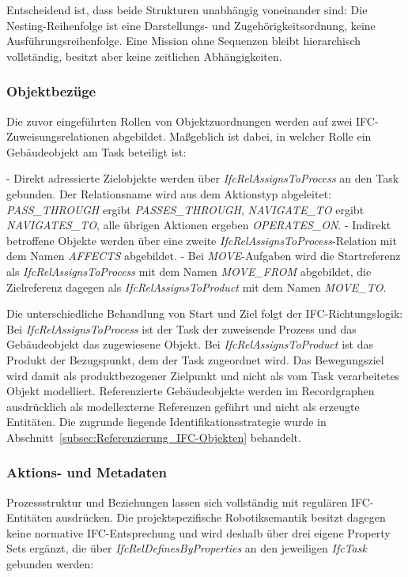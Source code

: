 Entscheidend ist, dass beide Strukturen unabhängig voneinander sind: Die Nesting-Reihenfolge ist
eine Darstellungs- und Zugehörigkeitsordnung, keine Ausführungsreihenfolge. Eine Mission ohne
Sequenzen bleibt hierarchisch vollständig, besitzt aber keine zeitlichen Abhängigkeiten.

\subsubsection{Objektbezüge}

Die zuvor eingeführten Rollen von Objektzuordnungen werden auf zwei IFC-Zuweisungsrelationen
abgebildet. Maßgeblich ist dabei, in welcher Rolle ein Gebäudeobjekt am Task beteiligt ist:

- Direkt adressierte Zielobjekte werden über \textit{IfcRelAssignsToProcess} an den Task gebunden.
Der Relationsname wird aus dem Aktionstyp abgeleitet: \textit{PASS\_THROUGH} ergibt
\textit{PASSES\_THROUGH}, \textit{NAVIGATE\_TO} ergibt \textit{NAVIGATES\_TO}, alle übrigen Aktionen
ergeben \textit{OPERATES\_ON}.
- Indirekt betroffene Objekte werden über eine zweite \textit{IfcRelAssignsToProcess}-Relation mit dem Namen \textit{AFFECTS} abgebildet.
- Bei \textit{MOVE}-Aufgaben wird die Startreferenz als \textit{IfcRelAssignsToProcess} mit dem
Namen \textit{MOVE\_FROM} abgebildet, die Zielreferenz dagegen als \textit{IfcRelAssignsToProduct}
mit dem Namen \textit{MOVE\_TO}.

Die unterschiedliche Behandlung von Start und Ziel folgt der IFC-Richtungslogik: Bei
\textit{IfcRelAssignsToProcess} ist der Task der zuweisende Prozess und das Gebäudeobjekt das
zugewiesene Objekt. Bei \textit{IfcRelAssignsToProduct} ist das Produkt der Bezugspunkt, dem der
Task zugeordnet wird. Das Bewegungsziel wird damit als produktbezogener Zielpunkt und nicht als vom
Task verarbeitetes Objekt modelliert. Referenzierte Gebäudeobjekte werden im Recordgraphen
ausdrücklich als modellexterne Referenzen geführt und nicht als erzeugte Entitäten. Die zugrunde
liegende Identifikationsstrategie wurde in Abschnitt~\ref{subsec:Referenzierung_IFC-Objekten} behandelt.

\subsubsection{Aktions- und Metadaten}

Prozessstruktur und Beziehungen lassen sich vollständig mit regulären IFC-Entitäten ausdrücken. Die
projektspezifische Robotiksemantik besitzt dagegen keine normative IFC-Entsprechung und wird deshalb
über drei eigene Property Sets ergänzt, die über \textit{IfcRelDefinesByProperties} an den
jeweiligen \textit{IfcTask} gebunden werden:

